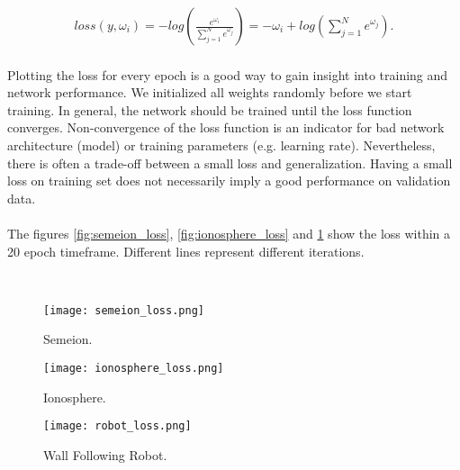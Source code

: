 \documentclass[a4paper, 11pt, twoside, openright]{article}
\begin{document}
\begin{equation}
	\begin{gathered}
		loss(y,\omega_{i}) = -log(\frac{e^{\omega_{i}}}{\sum_{j=1}^{N}{e^{\omega_{j}}}}) = -\omega_{i} + log(\sum_{j=1}^{N}{e^{\omega_{j}}}).
	\end{gathered}
	\label{eq:crossentropy}
\end{equation}
\\
Plotting the loss for every epoch is a good way to gain insight into training and network performance. We initialized all weights randomly before we start training. In general, the network should be trained until the loss function converges. Non-convergence of the loss function is an indicator for bad network architecture (model) or training parameters (e.g. learning rate). Nevertheless, there is often a trade-off between a small loss and generalization. Having a small loss on training set does not necessarily imply a good performance on validation data. \\ \\
The figures \ref{fig:semeion_loss}, \ref{fig:ionosphere_loss} and \ref{fig:robot_loss} show the loss within a 20 epoch timeframe. Different lines represent different iterations.

\begin{figure}[h!]
	 \\
	\vspace{0.2cm}
	\begin{minipage}[b]{0.3\textwidth}
	  \texttt{[image: semeion\_loss.png]}
		\vspace*{-8mm} %
		\captionsetup{font=footnotesize}
	  \caption{Semeion.}
	  \label{fig:semeion_loss}
	\end{minipage}
	\begin{minipage}[b]{0.3\textwidth}
	  \texttt{[image: ionosphere\_loss.png]}
		\vspace*{-8mm}
		\captionsetup{font=footnotesize}
	  \caption{Ionosphere.}
	  \label{fig:ionosphere_loss}
	\end{minipage}
	\begin{minipage}[b]{0.3\textwidth}
	  \texttt{[image: robot\_loss.png]}
		\vspace*{-8mm}
		\captionsetup{font=footnotesize}
	  \caption{Wall Following Robot.}
	  \label{fig:robot_loss}
	\end{minipage}
\end{figure}
\end{document}
